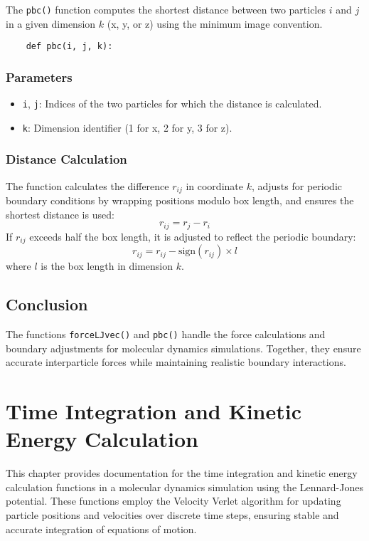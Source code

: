 \documentclass[12pt, ngerman]{report}
\begin{document}
The \texttt{pbc()} function computes the shortest distance between two particles \(i\) and \(j\) in a given dimension \(k\) (x, y, or z) using the minimum image convention.

\begin{verbatim}
	def pbc(i, j, k):
\end{verbatim}

\subsection*{Parameters}
\begin{itemize}
	\item \texttt{i}, \texttt{j}: Indices of the two particles for which the distance is calculated.
	\item \texttt{k}: Dimension identifier (1 for x, 2 for y, 3 for z).
\end{itemize}

\subsection*{Distance Calculation}
The function calculates the difference \(r_{ij}\) in coordinate \(k\), adjusts for periodic boundary conditions by wrapping positions modulo box length, and ensures the shortest distance is used:
\[
r_{ij} = r_j - r_i
\]
If \(r_{ij}\) exceeds half the box length, it is adjusted to reflect the periodic boundary:
\[
r_{ij} = r_{ij} - \text{sign}(r_{ij}) \times l
\]
where \(l\) is the box length in dimension \(k\).

\section{Conclusion}
The functions \texttt{forceLJvec()} and \texttt{pbc()} handle the force calculations and boundary adjustments for molecular dynamics simulations. Together, they ensure accurate interparticle forces while maintaining realistic boundary interactions.

\chapter{Time Integration and Kinetic Energy Calculation}
\label{chap:integration_energy}

This chapter provides documentation for the time integration and kinetic energy calculation functions in a molecular dynamics simulation using the Lennard-Jones potential. These functions employ the Velocity Verlet algorithm for updating particle positions and velocities over discrete time steps, ensuring stable and accurate integration of equations of motion.
\end{document}
